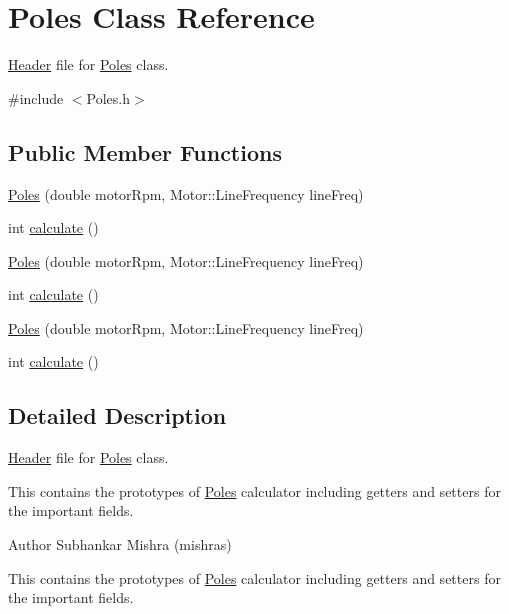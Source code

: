 \hypertarget{class_poles}{}\section{Poles Class Reference}
\label{class_poles}


\hyperlink{class_header}{Header} file for \hyperlink{class_poles}{Poles} class.  




{\ttfamily \#include $<$Poles.\+h$>$}

\subsection*{Public Member Functions}
\begin{DoxyCompactItemize}
\item 
\hyperlink{class_poles_aade5d01dab7a461e582449e5bb17f6d6}{Poles} (double motor\+Rpm, Motor\+::\+Line\+Frequency line\+Freq)
\item 
int \hyperlink{class_poles_a23988f68100374c8277dca81ab06f724}{calculate} ()
\item 
\hyperlink{class_poles_aade5d01dab7a461e582449e5bb17f6d6}{Poles} (double motor\+Rpm, Motor\+::\+Line\+Frequency line\+Freq)
\item 
int \hyperlink{class_poles_a23988f68100374c8277dca81ab06f724}{calculate} ()
\item 
\hyperlink{class_poles_aade5d01dab7a461e582449e5bb17f6d6}{Poles} (double motor\+Rpm, Motor\+::\+Line\+Frequency line\+Freq)
\item 
int \hyperlink{class_poles_a23988f68100374c8277dca81ab06f724}{calculate} ()
\end{DoxyCompactItemize}


\subsection{Detailed Description}
\hyperlink{class_header}{Header} file for \hyperlink{class_poles}{Poles} class. 

This contains the prototypes of \hyperlink{class_poles}{Poles} calculator including getters and setters for the important fields.

\begin{DoxyAuthor}{Author}
Subhankar Mishra (mishras) 
\end{DoxyAuthor}


This contains the prototypes of \hyperlink{class_poles}{Poles} calculator including getters and setters for the important fields.

